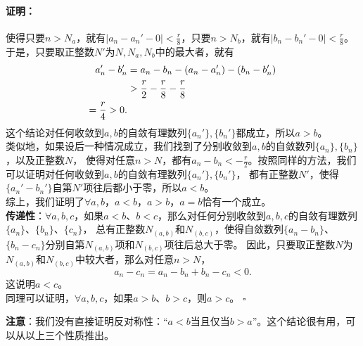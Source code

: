 \documentclass[12pt,UTF8]{ctexbook}
\newenvironment{proof2}{\paragraph{\textbf{证明：}}}{\hfill$\square$}
\begin{document}
\begin{appendix}
\begin{proof2}
    使得只要$n>N_a$，就有$|a_n - a_n' - 0| < \frac{r}{8}$，只要$n>N_b$，就有$|b_n - b_n' - 0| < \frac{r}{8}$。
    于是，只要取正整数$N'$为$N,N_a,N_b$中的最大者，就有
    \begin{align}
        a_n' - b_n' &= a_n - b_n - (a_n - a_n') - (b_n - b_n') \notag \\
        &> \frac{r}{2} - \frac{r}{8} - \frac{r}{8} \notag \\
        = \frac{r}{4} > 0. \notag
    \end{align}
    这个结论对任何收敛到$a,b$的自敛有理数列$\{a_n'\}, \{b_n'\}$都成立，所以$a>b$。\\
    类似地，如果设后一种情况成立，我们找到了分别收敛到$a,b$的自敛数列$\{a_n\}, \{b_n\}$，以及正整数$N$，
    使得对任意$n>N$，都有$a_n - b_n < -\frac{r}{2}$。按照同样的方法，我们可以证明对任何收敛到$a,b$的自敛有理数列$\{a_n'\}, \{b_n'\}$，
    都有正整数$N'$，使得$\{a_n' - b_n'\}$自第$N'$项往后都小于零，所以$a<b$。\\
    综上，我们证明了$\forall a, b$，$a < b$，$a > b$，$a = b$恰有一个成立。\\
    \textbf{传递性}：$\forall a, b, c$，如果$a < b$、$b < c$，那么对任何分别收敛到$a,b,c$的自敛有理数列$\{a_n\}$、$\{b_n\}$、$\{c_n\}$，
    总有正整数$N_{(a,b)}$和$N_{(b,c)}$，使得自敛数列$\{a_n - b_n\}$、$\{b_n - c_n\}$分别自第$N_{(a,b)}$项和$N_{(b,c)}$项往后总大于零。
    因此，只要取正整数$N$为$N_{(a,b)}$和$N_{(b,c)}$中较大者，那么对任意$n>N$，
    $$ a_n - c_n = a_n - b_n + b_n - c_n < 0.$$
    这说明$a<c$。\\
    同理可以证明，$\forall a, b, c$，如果$a > b$、$b > c$，则$a > c$。
\end{proof2}

\textbf{注意}：我们没有直接证明反对称性：“$a<b$当且仅当$b>a$”。这个结论很有用，可以从以上三个性质推出。


\end{appendix}
\end{document}
